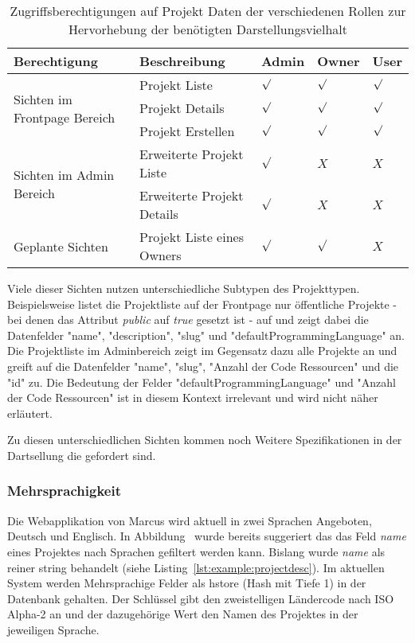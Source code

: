 \begin{table}[h!]
    \begin{tabular}{|p{}|p{}|p{}|p{}|p{}|}
        \hline
        \textbf{Berechtigung} & \textbf{Beschreibung} & \textbf{Admin} & \textbf{Owner} & \textbf{User} \\ \hline
        \multirow{3}{*}{Sichten im Frontpage Bereich}
        & Projekt Liste & $\surd$ & $\surd$ & $\surd$\\
        & Projekt Details & $\surd$ & $\surd$ & $\surd$\\
        & Projekt Erstellen & $\surd$ & $\surd$ & $\surd$ \\
        \hline
        \multirow{2}{*}{Sichten im Admin Bereich}
        & Erweiterte Projekt Liste & $\surd$ & $X$ & $X$\\
        & Erweiterte Projekt Details & $\surd$ & $X$ & $X$\\
        \hline
        \multirow{1}{*}{Geplante Sichten}
        & Projekt Liste eines Owners & $\surd$ & $\surd$ & $X$\\
        \hline
    \end{tabular}
    \vspace{5pt}
    \caption{Zugriffsberechtigungen auf Projekt Daten der verschiedenen Rollen zur Hervorhebung der benötigten Darstellungsvielhalt}
    \label{tbl:req:roles}
\end{table}

Viele dieser Sichten nutzen unterschiedliche Subtypen des Projekttypen.
Beispielsweise listet die Projektliste auf der Frontpage nur öffentliche Projekte - bei denen das Attribut \emph{public} auf \emph{true} gesetzt ist -
auf und zeigt dabei die Datenfelder "name", "description", "slug" und "defaultProgrammingLanguage" an.
Die Projektliste im Adminbereich zeigt im Gegensatz dazu alle Projekte an und greift auf
die Datenfelder "name", "slug", "Anzahl der Code Ressourcen" und die "id" zu.
Die Bedeutung der Felder "defaultProgrammingLanguage" und "Anzahl der Code Ressourcen" ist in diesem Kontext irrelevant und wird nicht näher erläutert.

Zu diesen unterschiedlichen Sichten kommen noch Weitere Spezifikationen in der Dartsellung die gefordert sind.

\subsubsection{Mehrsprachigkeit}
Die Webapplikation von Marcus wird aktuell in zwei Sprachen Angeboten, Deutsch und Englisch.
In Abbildung~ wurde bereits suggeriert das das Feld \emph{name} eines Projektes nach Sprachen gefiltert werden kann.
Bislang wurde \emph{name} als reiner string behandelt (siehe Listing~\ref{lst:example:projectdesc}). Im aktuellen System werden Mehrsprachige Felder
als hstore (Hash mit Tiefe 1) in der Datenbank gehalten. Der Schlüssel gibt den zweistelligen Ländercode nach ISO Alpha-2 \cite{iso-alpha-2} an
und der dazugehörige Wert den Namen des Projektes in der jeweiligen Sprache.

